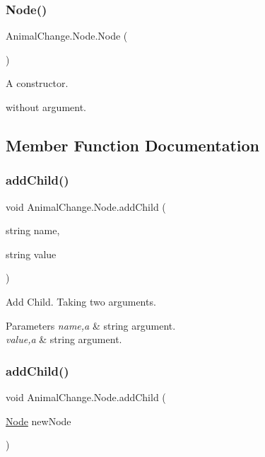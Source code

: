 \subsubsection{\texorpdfstring{Node()}{Node()}}
{\footnotesize\ttfamily Animal\+Change.\+Node.\+Node (\begin{DoxyParamCaption}{ }\end{DoxyParamCaption})\hspace{0.3cm}{\ttfamily [inline]}}



A constructor. 

without argument. 

\subsection{Member Function Documentation}
\mbox{\label{class_animal_change_1_1_node_afa898ee369ed1ead4ecd6f880e3744d8}} 
\subsubsection{\texorpdfstring{addChild()}{addChild()}\hspace{0.1cm}{\footnotesize\ttfamily [1/2]}}
{\footnotesize\ttfamily void Animal\+Change.\+Node.\+add\+Child (\begin{DoxyParamCaption}\item[{string}]{name,  }\item[{string}]{value }\end{DoxyParamCaption})\hspace{0.3cm}{\ttfamily [inline]}}



Add Child. Taking two arguments. 


\begin{DoxyParams}{Parameters}
{\em name,a} & string argument. \\
\hline
{\em value,a} & string argument. \\
\hline
\end{DoxyParams}
\mbox{\label{class_animal_change_1_1_node_ac38160caf74e60731c7f92abf8d62388}} 
\subsubsection{\texorpdfstring{addChild()}{addChild()}\hspace{0.1cm}{\footnotesize\ttfamily [2/2]}}
{\footnotesize\ttfamily void Animal\+Change.\+Node.\+add\+Child (\begin{DoxyParamCaption}\item[{\mbox{\hyperlink{class_animal_change_1_1_node}{Node}}}]{new\+Node }\end{DoxyParamCaption})\hspace{0.3cm}{\ttfamily [inline]}}



